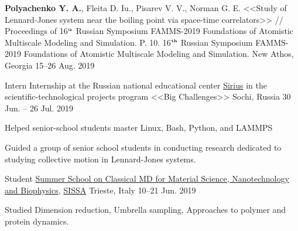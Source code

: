 \begin{cventries}

  \cventry
    {\textbf{Polyachenko Y. A.}, Fleita D. Iu., Pisarev V. V., Norman G. E. <<Study of Lennard-Jones system near the boiling point via space-time correlators>> // Proceedings of 16$^{\texttt{\tiny th}}$ Russian Symposium FAMMS-2019 Foundations of Atomistic Multiscale Modeling and Simulation. P. 10.} %
    {16$^{\textbf{\tiny th}}$ Russian Symposium FAMMS-2019 Foundations of Atomistic Multiscale Modeling and Simulation.} %
    {New Athos, Georgia} %
    {15--26 Aug. 2019} %
    {
      \begin{cvitems} %
      \end{cvitems}
    }
    
  \cventry
    {Intern} %
    {Internship at the Russian national educational center \href{https://sochisirius.ru/uploads/f/SiriusAnnualReport2019_en.pdf}{Sirius} in the scientific-technological projects program <<Big Challenges>>} %
    {Sochi, Russia} %
    {30 Jun. -- 26 Jul. 2019} %
    {
      \begin{cvitems} %
        \item {Helped senior-school students master Linux, Bash, Python, and LAMMPS}
        \item {Guided a group of senior school students in conducting research dedicated to studying collective motion in Lennard-Jones systems.}
      \end{cvitems}
    }

  \cventry
    {Student} %
    {\href{https://www.cecam.org/workshop-details/135}{Summer School on Classical MD for Material Science, Nanotechnology and Biophysics}, \href{https://www.sissa.it/}{SISSA}} %
    {Trieste, Italy} %
    {10--21 Jun. 2019} %
    {
      \begin{cvitems} %
        \item {Studied Dimension reduction, Umbrella sampling, Approaches to polymer and protein dynamics.}
      \end{cvitems}
    }
    

\end{cventries}
